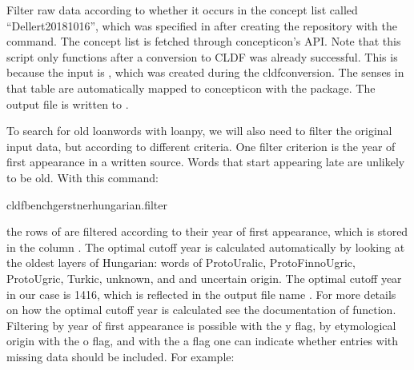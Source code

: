 \documentclass[letterpaper,10pt,english]{sphinxmanual}
\begin{document}
{{{{\begin{fulllineitems}
\end{fulllineitems}


\begin{fulllineitems}
\label{\detokenize{filter:gerstnerhungariancommands.map.run}}
\pysigstartsignatures
{}
\pysigstopsignatures
\sphinxAtStartPar
Filter raw data according to whether it occurs in the concept list called
“Dellert\sphinxhyphen{}2018\sphinxhyphen{}1016”, which was specified in  after
creating the repository with the  command. The concept
list is fetched through concepticon’s API. Note that this script only
functions after a conversion to CLDF was already successful. This is
because the input is , which was created during the
cldf\sphinxhyphen{}conversion. The senses in that table are automatically mapped to
concepticon with the  package.
The output file is written to .

\end{fulllineitems}


\sphinxAtStartPar
To search for old loanwords with loanpy, we will also need to filter the
original input data, but according to different criteria. One filter criterion
is the year of first appearance in a written source. Words that start
appearing late are unlikely to be old. With this command:

\begin{sphinxVerbatim}[commandchars=\\\{\}]
cldfbenchgerstnerhungarian.filter
\end{sphinxVerbatim}

\sphinxAtStartPar
the rows of  are filtered according to their year of first
appearance, which is stored in the column . The optimal cut\sphinxhyphen{}off year
is calculated automatically by looking at the oldest layers of Hungarian:
words of Proto\sphinxhyphen{}Uralic, Proto\sphinxhyphen{}Finno\sphinxhyphen{}Ugric, Proto\sphinxhyphen{}Ugric, Turkic, unknown, and
and uncertain origin. The optimal cut\sphinxhyphen{}off year in our case is 1416, which
is reflected in the output file name . For more details
on how the optimal cut\sphinxhyphen{}off year is calculated see the documentation of
function. Filtering by year of first appearance is possible with the \sphinxhyphen{}y flag,
by etymological origin with the \sphinxhyphen{}o flag, and with the \sphinxhyphen{}a flag one can indicate
whether entries with missing data should be included. For example:

}}}}
\end{document}
